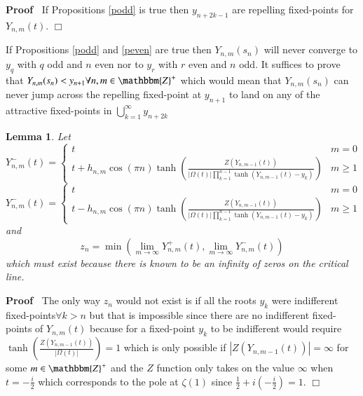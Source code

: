 \documentclass{elsarticle}
\newenvironment{proof}{\noindent\textbf{Proof\ }}{\hspace*{\fill}$\Box$\medskip}
\newtheorem{lemma}{Lemma}
{\theorembodyfont{\rmfamily}\newtheorem{note}{Note}}
\begin{document}
\begin{proof}
  If Propositions \ref{podd} is true then $y_{n + 2 k - 1}$ are repelling
  fixed-points for $Y_{n, m} (t)$.
\end{proof}

\begin{note}
  If Propositions \ref{podd} and \ref{peven} are true then $Y_{n, m} (s_n)$
  will never converge to $y_q$ with $q$ odd and $n$ even nor to $y_r$ with $r$
  even and $n$ odd. It suffices to prove that $Y_{n, m} (s_n) < y_{n + 1}
  \forall n, m \in \mathbbm{Z}^+$ which would mean that $Y_{n, m} (s_n)$ can
  never jump across the repelling fixed-point at $y_{n + 1}$ to land on any of
  the attractive fixed-points in $\bigcup_{k = 1}^{\infty} y_{n + 2 k}$
\end{note}

\begin{lemma}
  Let
  \begin{equation}
    Y^-_{n, m} (t) = \left\{ \begin{array}{ll}
      t & m = 0\\
      t + h_{n, m} \cos (\pi n) \tanh \left( \frac{Z (Y_{n, m - 1} (t))}{|
      \Omega (t) | \prod_{k = 1}^{n - 1} \tanh (Y_{n, m - 1} (t) - y_k)}
      \right) & m \geqslant 1
    \end{array} \right.
  \end{equation}
  \begin{equation}
    Y^-_{n, m} (t) = \left\{ \begin{array}{ll}
      t & m = 0\\
      t - h_{n, m} \cos (\pi n) \tanh \left( \frac{Z (Y_{n, m - 1} (t))}{|
      \Omega (t) | \prod_{k = 1}^{n - 1} \tanh (Y_{n, m - 1} (t) - y_k)}
      \right) & m \geqslant 1
    \end{array} \right.
  \end{equation}
  and
  \begin{equation}
    z_n = \min (\lim_{m \rightarrow \infty} Y^+_{n, m} (t), \lim_{m
    \rightarrow \infty} Y^-_{n, m} (t))
  \end{equation}
  which must exist because there is known to be an infinity of zeros on the
  critical line. 
\end{lemma}

\begin{proof}
  The only way $z_n$ would not exist is if all the roots $y_k$ were
  indifferent fixed-points$\forall k > n$ but that is impossible since there
  are no indifferent fixed-points of $Y_{n, m} (t)$ because for a fixed-point
  $y_k$ to be indifferent would require $\tanh \left( \frac{Z (Y_{n, m - 1}
  (t))}{| \Omega (t) |} \right) = 1$ which is only possible if $| Z (Y_{n, m -
  1} (t)) | = \infty$ for some $m \in \mathbbm{Z}^+$ and the $Z$ function only
  takes on the value $\infty$ when $t = - \frac{i}{2}$ which corresponds to
  the pole at $\zeta (1)$ since $\frac{1}{2} + i \left( - \frac{i}{2} \right)
  = 1$.
\end{proof}
\end{document}
